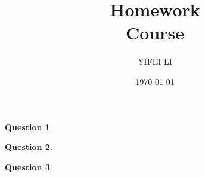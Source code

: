 \documentclass[12pt]{amsart}
\title{Homework  \\ Course}
\author{YIFEI LI}
\date{\today}
\theoremstyle{definition}
\newtheorem{question}{Question}
\theoremstyle{remark}
\theoremstyle{definition}
\begin{document}
\maketitle


\begin{question}

\end{question}

\begin{question}
  
\end{question}

\begin{question}
  
\end{question}
\end{document}
